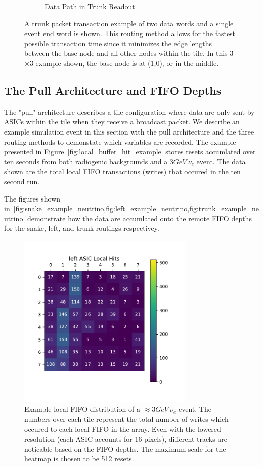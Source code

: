 \begin{figure}
\begin{subfigure}{.5\textwidth}
  \caption{Data Path in Trunk Readout}
\end{subfigure}
\caption{A trunk packet transaction example of two data words and a single event end word is shown. 
This routing method allows for the fastest possible transaction time since it minimizes the edge lengths between the base node and all other nodes within the tile.
In this 3$\times$3 example shown, the base node is at (1,0), or in the middle.}
\label{fig:trunk_packet_drift}
\end{figure}


\subsection{The Pull Architecture and FIFO Depths}

The "pull" architecture describes a tile configuration where data are only sent by ASICs within the tile when they receive a broadcast packet.
We describe an example simulation event in this section with the pull architecture and the three routing methods to demonstate which variables are recorded.
The example presented in Figure~\ref{fig:local_buffer_hit_example} stores resets accumlated over ten seconds from both radiogenic backgrounds and a 3$\unit{GeV}~\nu_{e}$ event.
The data shown are the total local FIFO transactions (writes) that occured in the ten second run.

The figures shown in~\cref{fig:snake_example_neutrino,fig:left_example_neutrino,fig:trunk_example_neutrino} demonstrate how the data are accumlated onto the remote FIFO depths for the snake, left, and trunk routings respectivey.

\begin{figure}[]
\centering
\includegraphics[width=0.75\textwidth]{images/left_asic_local.pdf}
\caption{Example local FIFO distribution of a $\approx 3\unit{GeV}~\nu_{e}$ event.
The numbers over each tile represent the total number of writes which occured to each local FIFO in the array.
Even with the lowered resolution (each ASIC accounts for 16 pixels), different tracks are noticable based on the FIFO depths.
The maximum scale for the heatmap is chosen to be 512 resets.
}
\end{figure}~\label{fig:local_buffer_hit_example}


